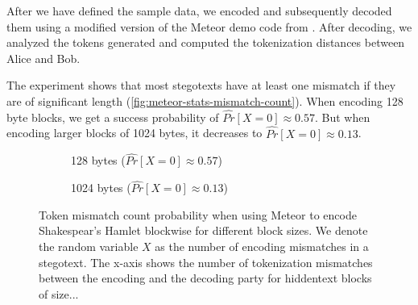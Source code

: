 After we have defined the sample data, we encoded and subsequently decoded them using a modified version of the Meteor demo code from \cite{MeteorDemo2021}.
After decoding, we analyzed the tokens generated and computed the tokenization distances between Alice and Bob.

The experiment shows that most stegotexts have at least one mismatch if they are of significant length (\autoref{fig:meteor-stats-mismatch-count}).
When encoding 128 byte blocks, we get a success probability of $\hat{Pr}[X=0] \approx 0.57$.
But when encoding larger blocks of 1024 bytes, it decreases to $\hat{Pr}[X=0] \approx 0.13$.

\begin{figure}[htbp]%
	\begin{subfigure}{.5\textwidth}%
		\centering%
	    \resizebox{0.9\linewidth}{!}{%
		}%
		\caption{128 bytes ($\hat{Pr}[X=0] \approx 0.57$)}%
	\end{subfigure}%
	\begin{subfigure}{.5\textwidth}%
		\centering%
	    \resizebox{0.9\linewidth}{!}{%
		}%
		\caption{1024 bytes ($\hat{Pr}[X=0] \approx 0.13$)}%
	\end{subfigure}%
	\caption{
	Token mismatch count probability when using Meteor to encode Shakespear's Hamlet blockwise for different block sizes.
	We denote the random variable $X$ as the number of encoding mismatches in a stegotext.
	The x-axis shows the number of tokenization mismatches between the encoding and the decoding party for hiddentext blocks of size...}
	\label{fig:meteor-stats-mismatch-count}	
\end{figure}


